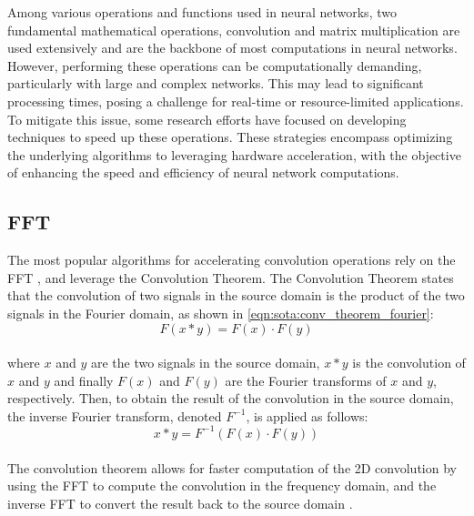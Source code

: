 Among various operations and functions used in neural networks, two fundamental
mathematical operations, convolution and matrix multiplication are used
extensively and are the backbone of most computations in neural networks.
However, performing these operations can be computationally demanding,
particularly with large and complex networks. This may lead to significant
processing times, posing a challenge for real-time or resource-limited
applications. To mitigate this issue, some research efforts have focused on
developing techniques to speed up these operations. These strategies encompass
optimizing the underlying algorithms to leveraging hardware acceleration, with
the objective of enhancing the speed and efficiency of neural network
computations.\\


\subsection{\acl{FFT}}\label{sec:sota:fft}
The most popular algorithms for
accelerating convolution operations rely on the \ac{FFT}
\cite{DBLP:conf/nips/ChiJM20,DBLP:journals/npl/LinY19,DBLP:conf/pkdd/PrattWCZ17},
and leverage the Convolution Theorem. The Convolution Theorem states that the
convolution of two signals in the source domain is the product of the two
signals in the Fourier domain, as shown in \cref{eqn:sota:conv_theorem_fourier}:\\

\begin{equation}
  \label{eqn:sota:conv_theorem_fourier}
  F(x * y) = F(x) \cdot F(y)
\end{equation}\\

\noindent where $x$ and $y$ are the two signals in the source domain, $x*y$ is
the convolution of $x$ and $y$ and finally $F(x)$ and $F(y)$ are the Fourier
transforms of $x$ and $y$, respectively. Then, to obtain the result of the
convolution in the source domain, the inverse Fourier transform, denoted
$F^{-1}$, is applied as follows:\\

\begin{equation}
  x * y = F^{-1}(F(x) \cdot F(y))
\end{equation}\\

\noindent The convolution theorem allows for faster computation of the 2D
convolution by using the \ac{FFT} to compute the convolution in the frequency
domain, and the inverse \ac{FFT} to convert the result back to the source domain
\cite{oppenheim1997signals}.

